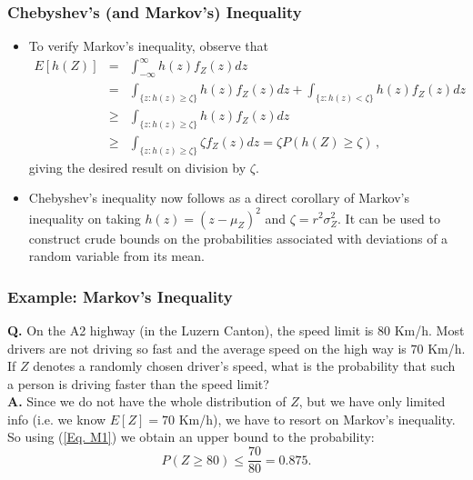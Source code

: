 \documentclass[notes=show,smaller,handout]{beamer}\usepackage[]{graphicx}\usepackage[]{color}
\renewcommand{\Pr}{P}
\newenvironment{stepitemize}{\begin{itemize}[<+->]}{\end{itemize} }
\begin{document}
\begin{frame}%

\frametitle{Chebyshev's (and Markov's) Inequality}

\begin{stepitemize}
\item To verify Markov's inequality, observe that
\begin{eqnarray*}
E[h( Z)]&=&\int_{-\infty }^{\infty }h(z) f_{Z}\left(z\right)dz\\
&=&\int_{\{z:h(z)\geq\zeta\}}h(z) f_{Z}\left(z\right) dz+
\int_{\{z:h(z)<\zeta\}}h(z) f_{Z}\left(z\right) dz \\
&\geq&\int_{\{z:h(z)\geq\zeta\}}h(z) f_{Z}\left(z\right) dz\\
&\geq&\int_{\{z:h(z)\geq\zeta\}}\zeta f_{Z}\left(z\right)dz=\zeta\Pr(h(Z)\geq\zeta)\,,
\end{eqnarray*}
giving the desired result on division by $\zeta$.
\item Chebyshev's inequality now follows as a direct corollary of Markov's inequality on taking $h(z)=(z-\mu_Z)^2$ and $\zeta=r^2\sigma_Z^2$.
It can be used to construct crude bounds on the probabilities associated with deviations of a random variable from its mean.

\end{stepitemize}

\end{frame}%

\begin{frame}%

\frametitle{Example: Markov's Inequality}

\begin{example}

\textbf{Q.} On the A2 highway (in the Luzern Canton), the speed limit is $80$ Km/h. Most drivers are not driving so fast and the average speed on the high way is $70$ Km/h.
If $Z$ denotes a randomly chosen driver's speed, what is the probability that such a person is driving faster than the speed limit? \\
\vspace{1cm}
\textbf{A.} Since we do not have the whole distribution of $Z$, but we have only limited info (i.e. we know $E[Z]=70$ Km/h), we have to resort on Markov's inequality. So using (\ref{Eq. M1}) we obtain an upper bound to the probability:
$$
P(Z \geq 80) \leq \frac{70}{80} = 0.875.
$$


\end{example}
\end{frame}%
\end{document}
